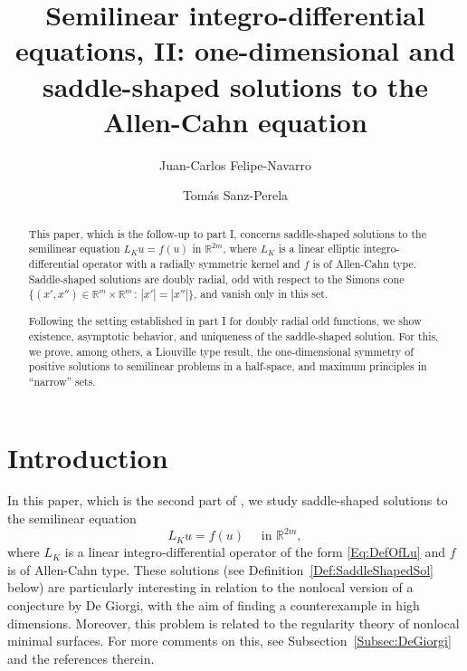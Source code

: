 \documentclass[12pt,reqno]{amsart}
\title[Semilinear integro-differential equations II]{Semilinear integro-differential equations, II: one-dimensional and saddle-shaped solutions to the Allen-Cahn equation}
\author{Juan-Carlos Felipe-Navarro}
\author{Tomás Sanz-Perela}
\theoremstyle{definition}
\theoremstyle{remark}
\newcommand{\con}[1]{\mathbb{#1}}
\newcommand{\R}{\con{R}} %
\numberwithin{equation}{section}
\begin{document}
\begin{abstract}
This paper, which is the follow-up to part I, concerns saddle-shaped solutions to the semilinear equation $L_K u = f(u)$ in $\mathbb{R}^{2m}$, where $L_K$ is a linear elliptic integro-differential operator with a radially symmetric kernel and $f$ is of Allen-Cahn type. Saddle-shaped solutions are doubly radial, odd with respect to the Simons cone $\{(x', x'') \in \mathbb{R}^m \times \mathbb{R}^m \, : \, |x'| = |x''|\}$, and vanish only in this set.

Following the setting established in part I for doubly radial odd functions, we show existence, asymptotic behavior, and uniqueness of the saddle-shaped solution. For this, we prove, among others, a Liouville type result, the one-dimensional symmetry of positive solutions to semilinear problems in a half-space, and maximum principles in ``narrow'' sets.
\end{abstract}


\maketitle


\tableofcontents

\section{Introduction}
\label{Sec:Introduction}

In this paper, which is the second part of \cite{FelipeSanz-Perela:IntegroDifferentialI}, we study saddle-shaped solutions to the semilinear equation
\begin{equation}
\label{Eq:NonlocalAllenCahn}
L_K u = f(u) \quad \textrm{ in } \R^{2m},
\end{equation}
where $L_K$ is a linear integro-differential operator of the form \eqref{Eq:DefOfLu} and $f$ is of Allen-Cahn type. These  solutions (see Definition~\ref{Def:SaddleShapedSol} below) are particularly interesting in relation to the nonlocal version of a conjecture by De Giorgi, with the aim of finding a counterexample in high dimensions. Moreover, this problem is related to the regularity theory of nonlocal minimal surfaces. For more comments on this, see Subsection~\ref{Subsec:DeGiorgi} and the references therein.
\end{document}
